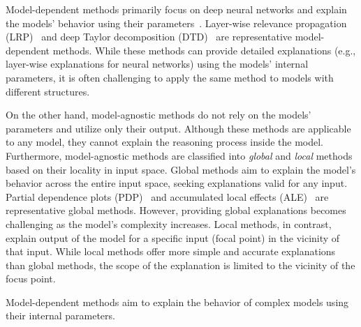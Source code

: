\documentclass[runningheads]{llncs}
\begin{document}
Model-dependent methods primarily focus on deep neural networks and
explain the models' behavior using their parameters~\cite{samek2021explaining}.
Layer-wise relevance propagation (LRP)~\cite{bach2015pixel} and
deep Taylor decomposition (DTD)~\cite{montavon2017explaining}
are representative model-dependent methods.
While these methods can provide detailed explanations
(e.g., layer-wise explanations for neural networks)
using the models' internal parameters,
it is often challenging
to apply the same method to models with different structures.

On the other hand,
model-agnostic methods
do not rely on the models' parameters and utilize only their output.
Although these methods are applicable to any model,
they cannot explain the reasoning process inside the model.
Furthermore, model-agnostic methods are classified into
\emph{global} and \emph{local} methods based on their locality in input space.
Global methods
aim to explain the model's behavior across the entire input space,
seeking explanations valid for any input.
Partial dependence plots (PDP)~\cite{friedman2001greedy} and
accumulated local effects (ALE)~\cite{apley2020visualizing}
are representative global methods.
However, providing global explanations becomes challenging
as the model's complexity increases.
Local methods, in contrast, explain output of the model for a specific input
(focal point) in the vicinity of that input.
While local methods offer more simple and accurate explanations
than global methods,
the scope of the explanation is limited to the vicinity of the focus point.

Model-dependent methods aim to explain the behavior of complex models
using their internal parameters.

% 
\end{document}
